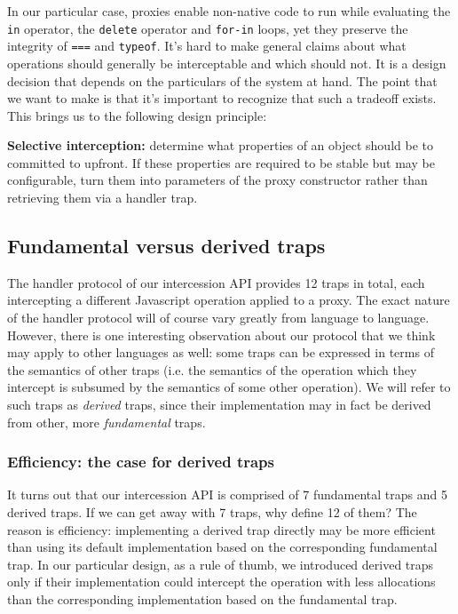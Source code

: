 \documentclass{acm_proc_article-sp}
\begin{document}
In our particular case, proxies enable non-native code to run while evaluating the \texttt{in} operator, the \texttt{delete} operator and \texttt{for-in} loops, yet they preserve the integrity of \texttt{===} and \texttt{typeof}. It's hard to make general claims about what operations should generally be interceptable and which should not. It is a design decision that depends on the particulars of the system at hand. The point that we want to make is that it's important to recognize that such a tradeoff exists. This brings us to the following design principle:

\textbf{Selective interception:} determine what properties of an object should be to committed to upfront. If these properties are required to be stable but may be configurable, turn them into parameters of the proxy constructor rather than retrieving them via a handler trap.

\subsection{Fundamental versus derived traps}
\label{sub:fundamental_vs_derived_traps}

The handler protocol of our intercession API provides 12 traps in total, each intercepting a different Javascript operation applied to a proxy. The exact nature of the handler protocol will of course vary greatly from language to language. However, there is one interesting observation about our protocol that we think may apply to other languages as well: some traps can be expressed in terms of the semantics of other traps (i.e. the semantics of the operation which they intercept is subsumed by the semantics of some other operation). We will refer to such traps as \emph{derived} traps, since their implementation may in fact be derived from other, more \emph{fundamental} traps.

\subsubsection{Efficiency: the case for derived traps}

It turns out that our intercession API is comprised of 7 fundamental traps and 5 derived traps. If we can get away with 7 traps, why define 12 of them? The reason is efficiency: implementing a derived trap directly may be more efficient than using its default implementation based on the corresponding fundamental trap. In our particular design, as a rule of thumb, we introduced derived traps only if their implementation could intercept the operation with less allocations than the corresponding implementation based on the fundamental trap.
\end{document}
